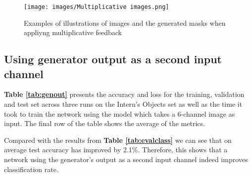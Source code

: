 \documentclass{l4proj}
\begin{document}
\begin{figure}[H]
    \centering
    \texttt{[image: images/Multiplicative images.png]}
    \caption{Examples of illustrations of images and the generated masks when appliyng multiplicative feedback}
    \label{fig:multiplicativemask} 
\end{figure}

\subsection{Using generator output as a second input channel}

\textbf{Table \ref{tab:genout}} presents the accuracy and loss for the training, validation and test set across three runs on the Intern's Objects set as well as the time it took to train the network using the model which takes a 6-channel image as input. The final row of the table shows the average of the metrics.

Compared with the results from \textbf{Table \ref{tab:evalclass}} we can see that on average test accuracy has improved by 2.1\%. Therefore, this shows that a network using the generator's output as a second input channel indeed improves classification rate.
\end{document}
